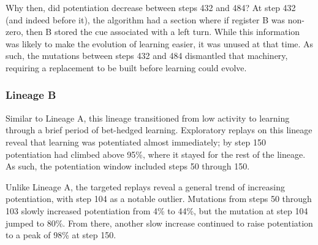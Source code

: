 Why then, did potentiation decrease between steps 432 and 484?
At step 432 (and indeed before it), the algorithm had a section where if register B was non-zero, then B stored the cue associated with a left turn. 
While this information was likely to make the evolution of learning easier, it was unused at that time. 
As such, the mutations between steps 432 and 484 dismantled that machinery, requiring a replacement to be built before learning could evolve.


\subsubsection{Lineage B}


Similar to Lineage A, this lineage transitioned from low activity to learning through a brief period of bet-hedged learning. 
Exploratory replays on this lineage reveal that learning was potentiated almost immediately; by step 150 potentiation had climbed above 95\%, where it stayed for the rest of the lineage. 
As such, the potentiation window included steps 50 through 150. %

Unlike Lineage A, the targeted replays reveal a general trend of increasing potentiation, with step 104 as a notable outlier. 
Mutations from steps 50 through 103 slowly increased potentiation from 4\% to 44\%, but the mutation at step 104 jumped to 80\%. 
From there, another slow increase continued to raise potentiation to a peak of 98\% at step 150.

